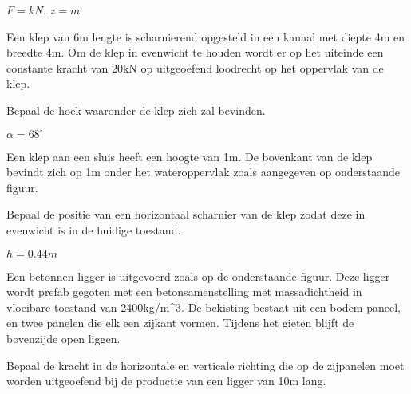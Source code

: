 	\begin{antwoord}
		$F = \unit{}{kN}$, $z=\unit{}{m}$ 
	\end{antwoord}
	\begin{toepassing}
		\label{sluisklephoek}
Een klep van 6m lengte is scharnierend opgesteld in een kanaal met diepte 4m en breedte 4m. Om de klep in evenwicht te houden wordt er op het uiteinde een constante kracht van \unit{20}{kN} op uitgeoefend loodrecht op het oppervlak van de klep.
		
Bepaal de hoek waaronder de klep zich zal bevinden.
		\begin{center}
		\end{center}
	\end{toepassing}
	\begin{antwoord}
		$\alpha = \unit{68}{^\circ}$ 
	\end{antwoord}	
	\begin{toepassing*}
		\label{sluisklep}
Een klep aan een sluis heeft een hoogte van \unit{1}{m}. De bovenkant van de klep bevindt zich op 1m onder het wateroppervlak zoals aangegeven op onderstaande figuur.
		
Bepaal de positie van een horizontaal scharnier van de klep zodat deze in evenwicht is in de huidige toestand.
		\begin{center}
			
		\end{center}
	\end{toepassing*}
	\begin{antwoord}
		$h = \unit{0.44}{m}$
	\end{antwoord}
	\begin{toepassing*}
		\label{betonnenligger}
Een betonnen ligger is uitgevoerd zoals op de onderstaande figuur. Deze ligger wordt prefab gegoten met een betonsamenstelling met massadichtheid in vloeibare toestand van \unit{2400}{kg/m^3}. De bekisting bestaat uit een bodem paneel, en twee panelen die elk een zijkant vormen. Tijdens het gieten blijft de bovenzijde open liggen.
		
Bepaal de kracht in de horizontale en verticale richting die op de zijpanelen moet worden uitgeoefend bij de productie van een ligger van \unit{10}{m} lang.
		\begin{center}
			
		\end{center}
	\end{toepassing*}
